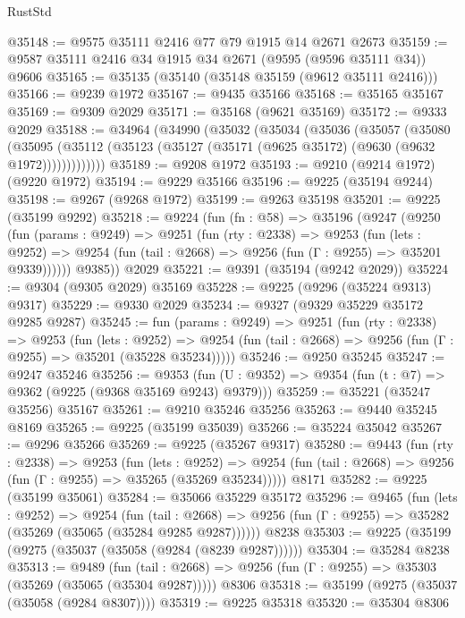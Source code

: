 \begin{lexlean}{RustStd}
\begin{coremodule}
@35148 := @9575 @35111 @2416 @77 @79 @1915 @14 @2671 @2673
@35159 := @9587 @35111 @2416 @34 @1915 @34 @2671 (@9595 (@9596 @35111 @34)) @9606
@35165 := @35135 (@35140 (@35148 @35159 (@9612 @35111 @2416)))
@35166 := @9239 @1972
@35167 := @9435 @35166
@35168 := @35165 @35167
@35169 := @9309 @2029
@35171 := @35168 (@9621 @35169)
@35172 := @9333 @2029
@35188 := @34964
    (@34990
      (@35032
        (@35034
          (@35036
            (@35057
              (@35080
                (@35095
                  (@35112 (@35123 (@35127 (@35171 (@9625 @35172) (@9630 (@9632 @1972)))))))))))))
@35189 := @9208 @1972
@35193 := @9210 (@9214 @1972) (@9220 @1972)
@35194 := @9229 @35166
@35196 := @9225 (@35194 @9244)
@35198 := @9267 (@9268 @1972)
@35199 := @9263 @35198
@35201 := @9225 (@35199 @9292)
@35218 := @9224
    (fun (fn : @58) =>
    @35196
      (@9247
        (@9250
          (fun (params : @9249) =>
          @9251
            (fun (rty : @2338) =>
            @9253
              (fun (lets : @9252) =>
              @9254 (fun (tail : @2668) => @9256 (fun (Γ : @9255) => @35201 @9339))))))
        @9385))
    @2029
@35221 := @9391 (@35194 (@9242 @2029))
@35224 := @9304 (@9305 @2029) @35169
@35228 := @9225 (@9296 (@35224 @9313) @9317)
@35229 := @9330 @2029
@35234 := @9327 (@9329 @35229 @35172 @9285 @9287)
@35245 := fun (params : @9249) =>
  @9251
    (fun (rty : @2338) =>
    @9253
      (fun (lets : @9252) =>
      @9254 (fun (tail : @2668) => @9256 (fun (Γ : @9255) => @35201 (@35228 @35234)))))
@35246 := @9250 @35245
@35247 := @9247 @35246
@35256 := @9353
    (fun (U : @9352) => @9354 (fun (t : @7) => @9362 (@9225 (@9368 @35169 @9243) @9379)))
@35259 := @35221 (@35247 @35256) @35167
@35261 := @9210 @35246 @35256
@35263 := @9440 @35245 @8169
@35265 := @9225 (@35199 @35039)
@35266 := @35224 @35042
@35267 := @9296 @35266
@35269 := @9225 (@35267 @9317)
@35280 := @9443
    (fun (rty : @2338) =>
    @9253
      (fun (lets : @9252) =>
      @9254 (fun (tail : @2668) => @9256 (fun (Γ : @9255) => @35265 (@35269 @35234)))))
    @8171
@35282 := @9225 (@35199 @35061)
@35284 := @35066 @35229 @35172
@35296 := @9465
    (fun (lets : @9252) =>
    @9254
      (fun (tail : @2668) =>
      @9256 (fun (Γ : @9255) => @35282 (@35269 (@35065 (@35284 @9285 @9287))))))
    @8238
@35303 := @9225 (@35199 (@9275 (@35037 (@35058 (@9284 (@8239 @9287))))))
@35304 := @35284 @8238
@35313 := @9489
    (fun (tail : @2668) => @9256 (fun (Γ : @9255) => @35303 (@35269 (@35065 (@35304 @9287)))))
    @8306
@35318 := @35199 (@9275 (@35037 (@35058 (@9284 @8307))))
@35319 := @9225 @35318
@35320 := @35304 @8306

\end{coremodule}
\end{lexlean}
